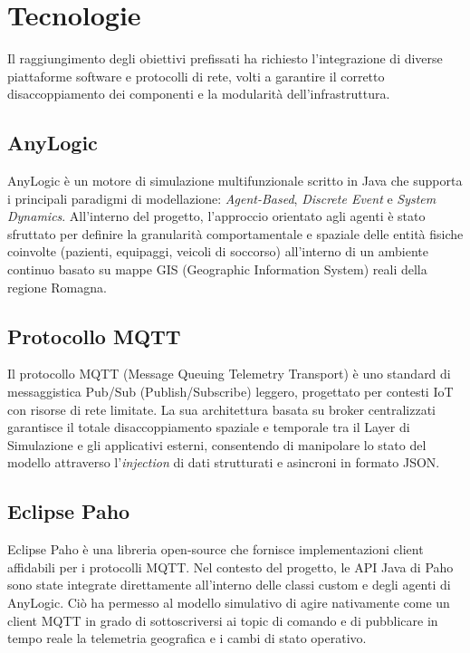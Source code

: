 \documentclass[12pt,a4paper,oneside]{article}
\begin{document}
\section{Tecnologie}
Il raggiungimento degli obiettivi prefissati ha richiesto l'integrazione di 
diverse piattaforme software e protocolli di rete, volti a garantire il 
corretto disaccoppiamento dei componenti e la modularità dell'infrastruttura.

\subsection{AnyLogic}
AnyLogic è un motore di simulazione multifunzionale scritto in Java che supporta i principali 
paradigmi di modellazione: \textit{Agent-Based}, \textit{Discrete Event} e 
\textit{System Dynamics}. All'interno del progetto, l'approccio orientato 
agli agenti è stato sfruttato per definire la granularità comportamentale 
e spaziale delle entità fisiche coinvolte (pazienti, equipaggi, veicoli di 
soccorso) all'interno di un ambiente continuo basato su mappe GIS (Geographic 
Information System) reali della regione Romagna.

\subsection{Protocollo MQTT}
Il protocollo MQTT (Message Queuing Telemetry Transport) è uno standard di 
messaggistica Pub/Sub (Publish/Subscribe) leggero, progettato per contesti 
IoT con risorse di rete limitate. La sua architettura basata su broker 
centralizzati garantisce il totale disaccoppiamento spaziale e temporale 
tra il Layer di Simulazione e gli applicativi esterni, consentendo di manipolare
 lo stato del modello attraverso l'\textit{injection} di dati strutturati e 
 asincroni in formato JSON.

\subsection{Eclipse Paho}
Eclipse Paho è una libreria open-source che fornisce implementazioni client 
affidabili per i protocolli MQTT. Nel contesto del progetto, le API Java di 
Paho sono state integrate direttamente all'interno delle classi custom e degli 
agenti di AnyLogic. Ciò ha permesso al modello simulativo di agire nativamente 
come un client MQTT in grado di sottoscriversi ai topic di comando e di pubblicare 
in tempo reale la telemetria geografica e i cambi di stato operativo.
\end{document}
